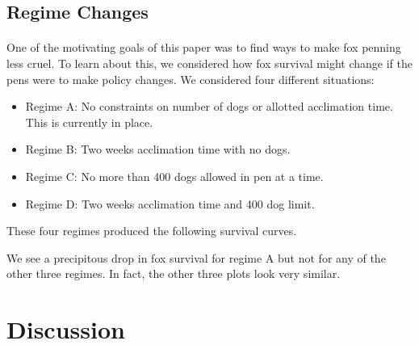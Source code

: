 \documentclass[aoas,preprint]{imsart}
\numberwithin{equation}{section}
\theoremstyle{plain}
\begin{document}
\subsection{Regime Changes}

\paragraph{}One of the motivating goals of this paper was to find ways to make fox penning less cruel. To learn about this, we considered how fox survival might change if the pens were to make policy changes. We considered four different situations:

	\begin{itemize}
		\item Regime A: No constraints on number of dogs or allotted acclimation time. This is currently in place.
		\item Regime B: Two weeks acclimation time with no dogs.
		\item Regime C: No more than 400 dogs allowed in pen at a time.
		\item Regime D: Two weeks acclimation time and 400 dog limit.
	\end{itemize}
These four regimes produced the following survival curves.

We see a precipitous drop in fox survival for regime A but not for any of the other three regimes. In fact, the other three plots look very similar.

\section{Discussion}
\end{document}
